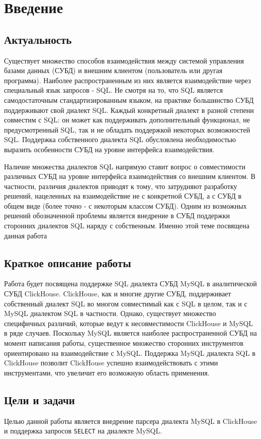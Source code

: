 \section{Введение}
\subsection{Актуальность}
Существует множество способов взаимодействия между системой управления базами данных (СУБД) и внешним клиентом (пользователь или другая программа). Наиболее распространенным из них является взаимодействие через специальный язык запросов - SQL. Не смотря на то, что SQL является самодостаточным стандартизированным языком, на практике большинство СУБД поддерживают свой диалект SQL. Каждый конкретный диалект в разной степени совместим с SQL: он может как поддерживать дополнительный функционал, не предусмотренный SQL, так и не обладать поддержкой некоторых возможностей SQL. Поддержка собственного диалекта SQL обусловлена необходимостью выразить особенности СУБД на уровне интерфейса взаимодействия.

Наличие множества диалектов SQL напрямую ставит вопрос о совместимости различных СУБД на уровне интерфейса взаимодействия со внешним клиентом. В частности, различия диалектов приводят к тому, что затрудняют разработку решений, нацеленных на взаимодействие не с конкретной СУБД, а с СУБД в общем виде (более точно - с некоторым классом СУБД). Одним из возможных решений обозначенной проблемы является внедрение в СУБД поддержки сторонних диалектов SQL наряду с собственным. Именно этой теме посвящена данная работа

\subsection{Краткое описание работы}
Работа будет посвящена поддержке SQL диалекта СУБД MySQL в аналитической СУБД ClickHouse. ClickHouse, как и многие другие СУБД, поддерживает собственный диалект SQL во многом совместимый как с SQL в целом, так и с MySQL диалектом SQL в частности. Однако, существует множество специфичных различий, которые ведут к несовместимости ClickHouse и MySQL в ряде случаев. Поскольку MySQL является наиболее распространенной СУБД на момент написания работы, существенное множество сторонних инструментов ориентировано на взаимодействие с MySQL. Поддержка MySQL диалекта SQL в ClickHouse позволит ClickHouse успешно взаимодействовать с этими инструментами, что увеличит его возможную область применения.  

\subsection{Цели и задачи}
Целью данной работы является внедрение парсера диалекта MySQL в ClickHouse и поддержка запросов \lstinline[style=customsql]|SELECT| на диалекте MySQL. 

